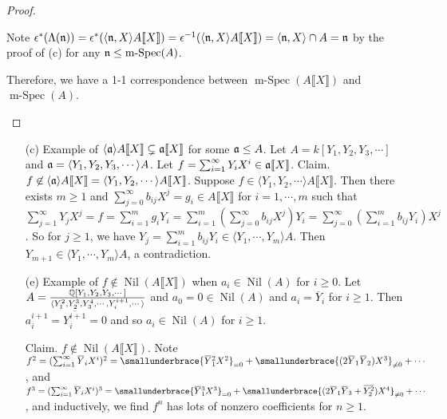 \begin{proof}
\begin{enumerate}
            Note $\epsilon^*(\Lambda(\mathfrak{n})) = \epsilon^*(\langle \mathfrak{n},X \rangle A\llbracket X \rrbracket)= \epsilon^{-1}(\langle \mathfrak{n},X \rangle A\llbracket X \rrbracket) = \langle \mathfrak{n},X \rangle \cap A = \mathfrak{n}$ by the proof of (c) for any $\mathfrak{n} \leq \operatorname{m-Spec}(A)$. \par 
            Therefore, we have a 1-1 correspondence between $\operatorname{m-Spec}(A\llbracket X \rrbracket)$ and $\operatorname{m-Spec}(A)$.
        \qedhere
    \end{enumerate}
\end{proof}

\begin{example}\label{1.69}
    \begin{enumerate}
        \item [(c)] Example of $\langle \mathfrak{a} \rangle A\llbracket X \rrbracket \subsetneq \mathfrak{a}\llbracket X \rrbracket$ for some $\mathfrak{a} \leq A$. Let $A = k[Y_1,Y_2,Y_3,\cdots]$ and $\mathfrak{a} = \langle Y_1,Y_2,Y_3,\cdots \rangle A$. Let $f = \sum_{i=1}^\infty Y_iX^i \in \mathfrak{a} \llbracket X \rrbracket$. Claim. $f \not \in \langle \mathfrak{a} \rangle A\llbracket X \rrbracket = \langle Y_1,Y_2,\cdots \rangle A\llbracket X \rrbracket$. Suppose $f \in \langle Y_1,Y_2,\cdots \rangle A\llbracket X \rrbracket$. Then there exists $m \geq 1$ and $\sum_{j=0}^\infty b_{ij}X^j = g_i \in A\llbracket X \rrbracket$ for $i = 1,\cdots,m$ such that $\sum_{j=1}^\infty Y_jX^j = f = \sum_{i=1}^m g_iY_i = \sum_{i=1}^m (\sum_{j=0}^\infty b_{ij}X^j)Y_i = \sum_{j=0}^\infty (\sum_{i=1}^m b_{ij}Y_i)X^j$. So for $j \geq 1$, we have $Y_j = \sum_{i=1}^m b_{ij}Y_i \in \langle Y_1,\cdots,Y_m \rangle A$. Then $Y_{m+1} \in \langle Y_1,\cdots,Y_m \rangle A$, a contradiction.
        \item [(e)]
            Example of $f \not \in \operatorname{Nil}(A\llbracket X \rrbracket)$ when $a_i \in \operatorname{Nil}(A)$ for $i \geq 0$. Let $A = \frac{\mathbb{Q}[Y_1,Y_2,Y_3,\cdots]}{\langle Y_1^2,Y_2^3,Y_3^4,\cdots,Y_i^{i+1},\cdots \rangle}$ and $a_0 = 0 \in \operatorname{Nil}(A)$ and $a_i = \overbar Y_i$ for $i \geq 1$. Then $a_i^{i+1} = \overbar{Y_i^{i+1}} = 0$ and so $a_i \in \operatorname{Nil}(A)$ for $i \geq 1$. \par 
            Claim. $f \not \in \operatorname{Nil}(A\llbracket X \rrbracket)$. Note $f^2 = (\sum_{i=1}^\infty \overbar Y_i X^i)^2 = \smallunderbrace{\overbar Y_1^2 X^2}_{= 0} + \smallunderbrace{(2\overbar Y_1 \overbar Y_2)X^3}_{\neq 0} + \cdots$, and $f^3 = (\sum_{i=1}^\infty \overbar Y_i X^i)^3 = \smallunderbrace{\overbar Y_1^3 X^3}_{= 0} + \smallunderbrace{(2\overbar Y_1 \overbar Y_3 + \overbar {Y_2^2})X^4}_{\neq 0} + \cdots$, and inductively, we find $f^n$ has lots of nonzero coefficients for $n \geq 1$.
    \end{enumerate}
\end{example}

